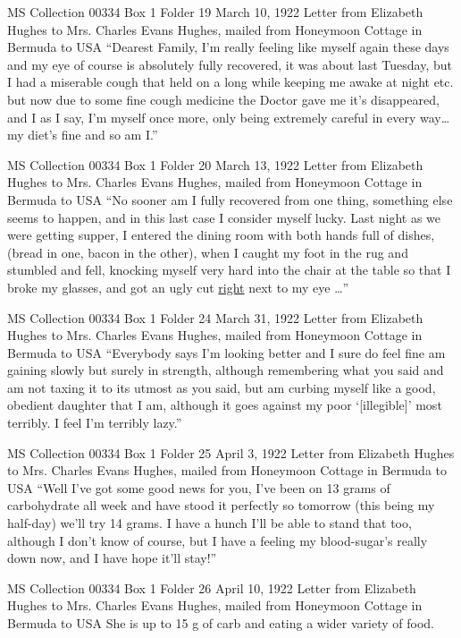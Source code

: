 \documentclass[12pt]{article}
\begin{document}
MS Collection 00334
Box 1 Folder 19
March 10, 1922
Letter from Elizabeth Hughes to Mrs. Charles Evans Hughes, mailed from Honeymoon Cottage in Bermuda to USA
``Dearest Family, I'm really feeling like myself again these days and my eye of course is absolutely fully recovered, it was about last Tuesday, but I had a miserable cough that held on a long while keeping me awake at night etc. but now due to some fine cough medicine the Doctor gave me it's disappeared, and I as I say, I'm myself once more, only being extremely careful in every way\dots my diet's fine and so am I.''

MS Collection 00334
Box 1 Folder 20
March 13, 1922
Letter from Elizabeth Hughes to Mrs. Charles Evans Hughes, mailed from Honeymoon Cottage in Bermuda to USA
``No sooner am I fully recovered from one thing, something else seems to happen, and in this last case I consider myself  lucky. Last night as we were getting supper, I entered the dining room with both hands full of dishes, (bread in one, bacon in the other), when I caught my foot in the rug and stumbled and fell, knocking myself very hard into the chair at the table so that I broke my glasses, and got an ugly cut \underline{right} next to my eye \dots'' 


MS Collection 00334
Box 1 Folder 24
March 31, 1922
Letter from Elizabeth Hughes to Mrs. Charles Evans Hughes, mailed from Honeymoon Cottage in Bermuda to USA
``Everybody says I'm looking better and I sure do feel fine am gaining slowly but surely in strength, although remembering what you said and am not taxing it to its utmost as you said, but am curbing myself like a good, obedient daughter that I am, although it goes against my poor `[illegible]' most terribly. I feel I'm terribly lazy.'' 

MS Collection 00334
Box 1 Folder 25
April 3, 1922
Letter from Elizabeth Hughes to Mrs. Charles Evans Hughes, mailed from Honeymoon Cottage in Bermuda to USA
``Well I've got some good news for you, I've been on 13 grams of carbohydrate all week and have stood it perfectly so tomorrow (this being my half-day) we'll try 14 grams. I have a hunch I'll be able to stand that too, although I don't know of course, but I have a feeling my blood-sugar's really down now, and I have hope it'll stay!'' 

MS Collection 00334
Box 1 Folder 26
April 10, 1922
Letter from Elizabeth Hughes to Mrs. Charles Evans Hughes, mailed from Honeymoon Cottage in Bermuda to USA
She is up to 15 g of carb and eating a wider variety of food. 
\end{document}
